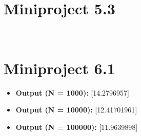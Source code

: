 \documentclass[a4paper]{article}
\begin{document}
\newpage

\section*{Miniproject 5.3}

\begin{figure}[ht!] %
\centering
{}
\\
\end{figure}

\section*{Miniproject 6.1}

\begin{itemize}
	\item \textbf{Output (N = 1000): } [14.2796957]
	\item \textbf{Output (N = 10000): } [12.41701961]
	\item \textbf{Output (N = 100000): } [11.9639898]
\end{itemize}
\end{document}
